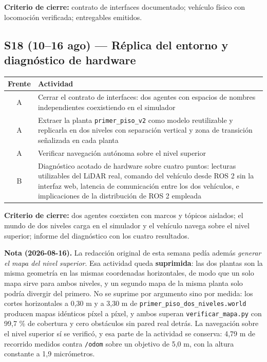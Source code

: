 \documentclass[12pt,letterpaper]{article}
\begin{document}
\textbf{Criterio de cierre:} contrato de interfaces documentado; vehículo físico con locomoción verificada; entregables emitidos.

\subsection{S18 (10--16 ago) --- Réplica del entorno y diagnóstico de hardware}

\begin{table}[H]
    \centering
    \small
    \begin{tabular}{@{}cp{12.8cm}@{}}
        \toprule
        \textbf{Frente} & \textbf{Actividad} \\ \midrule
        A & Cerrar el contrato de interfaces: dos agentes con espacios de nombres independientes coexistiendo en el simulador \\ \addlinespace
        A & Extraer la planta \texttt{primer\_piso\_v2} como modelo reutilizable y replicarla en dos niveles con separación vertical y zona de transición señalizada en cada planta \\ \addlinespace
        A & Verificar navegación autónoma sobre el nivel superior \\ \addlinespace
        B & Diagnóstico acotado de hardware sobre cuatro puntos: lecturas utilizables del LiDAR real, comando del vehículo desde ROS 2 sin la interfaz web, latencia de comunicación entre los dos vehículos, e implicaciones de la distribución de ROS 2 empleada \\ \bottomrule
    \end{tabular}
\end{table}

\textbf{Criterio de cierre:} dos agentes coexisten con marcos y tópicos aislados; el mundo de dos niveles carga en el simulador y el vehículo navega sobre el nivel superior; informe del diagnóstico con los cuatro resultados.

\textbf{Nota (2026-08-16).} La redacción original de esta semana pedía además \textit{generar el mapa del nivel superior}. Esa actividad queda \textbf{suprimida}: las dos plantas son la misma geometría en las mismas coordenadas horizontales, de modo que un solo mapa sirve para ambos niveles, y un segundo mapa de la misma planta solo podría divergir del primero. No se suprime por argumento sino por medida: los cortes horizontales a 0,30 m y a 3,30 m de \texttt{primer\_piso\_dos\_niveles.world} producen mapas idénticos píxel a píxel, y ambos superan \texttt{verificar\_mapa.py} con 99,7 \% de cobertura y cero obstáculos sin pared real detrás. La navegación sobre el nivel superior sí se verificó, y esa parte de la actividad se conserva: 4,79 m de recorrido medidos contra \texttt{/odom} sobre un objetivo de 5,0 m, con la altura constante a 1,9 micrómetros.
\end{document}
